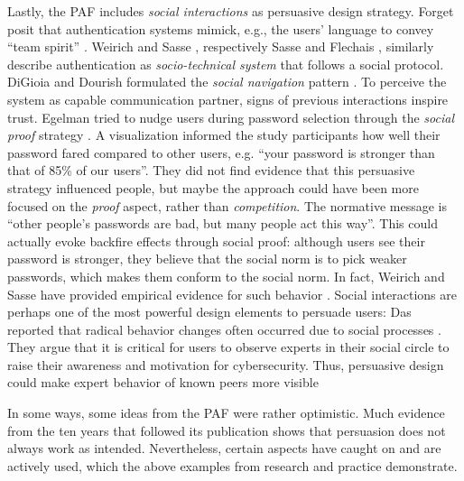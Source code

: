 	Lastly, the \gls{PAF} includes \textit{social interactions} as persuasive design strategy. Forget \etal posit that authentication systems mimick, e.g., the users' language to convey ``team spirit'' \cite{Forget2008PersuasionStrongerPasswords}. Weirich and Sasse \cite{Weirich2001PrettyGoodPersuasion}, respectively Sasse and Flechais \cite{Sasse2005UsableSecurityPosition}, similarly describe authentication as \textit{socio-technical system} that follows a social protocol. DiGioia and Dourish formulated the \textit{social navigation} pattern \cite{DiGioia2005SocialNavigationUsableSecurity}. To perceive the system as capable communication partner, signs of previous interactions inspire trust. Egelman \etal tried to nudge users during password selection through the \textit{social proof} strategy \cite{Egelman2013DoesMyPasswordGoUpToEleven}. A visualization informed the study participants how well their password fared compared to other users, e.g. ``your password is stronger than that of 85\% of our users''. They did not find evidence that this persuasive strategy influenced people, but maybe the approach could have been more focused on the \textit{proof} aspect, rather than \textit{competition}. The normative message is ``other people's passwords are bad, but many people act this way''. This could actually evoke backfire effects through social proof: although users see their password is stronger, they believe that the social norm is to pick weaker passwords, which makes them conform to the social norm. In fact, Weirich and Sasse have provided empirical evidence for such behavior \cite{Weirich2001PrettyGoodPersuasion}. Social interactions are perhaps one of the most powerful design elements to persuade users: Das \etal reported that radical behavior changes often occurred due to social processes \cite{Das2014EffectSocialInfluenceSecuritySensitivity}. They argue that it is critical for users to observe experts in their social circle to raise their awareness and motivation for cybersecurity. Thus, persuasive design could make expert behavior of known peers more visible
	
	In some ways, some ideas from the \acrlong{PAF} were rather optimistic. Much evidence from the ten years that followed its publication shows that persuasion does not always work as intended. Nevertheless, certain aspects have caught on and are actively used, which the above examples from research and practice demonstrate.  %
	
